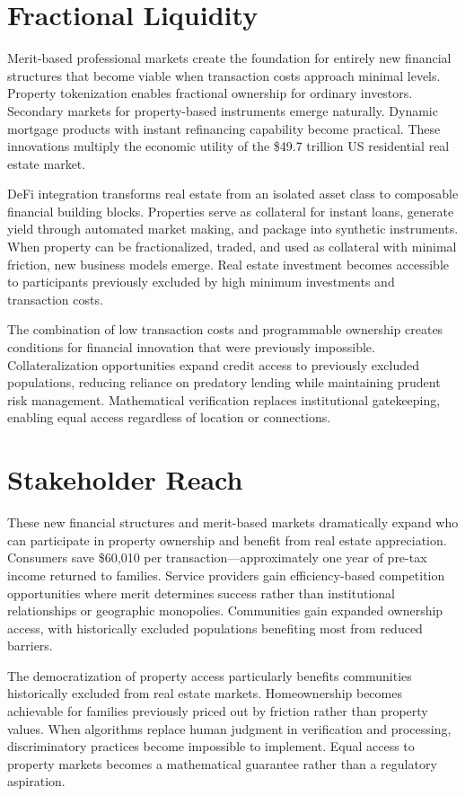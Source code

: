 \section{Fractional Liquidity}

Merit-based professional markets create the foundation for entirely new financial structures that become viable when transaction costs approach minimal levels. Property tokenization enables fractional ownership for ordinary investors. Secondary markets for property-based instruments emerge naturally. Dynamic mortgage products with instant refinancing capability become practical. These innovations multiply the economic utility of the \$49.7 trillion US residential real estate market.

DeFi integration transforms real estate from an isolated asset class to composable financial building blocks. Properties serve as collateral for instant loans, generate yield through automated market making, and package into synthetic instruments. When property can be fractionalized, traded, and used as collateral with minimal friction, new business models emerge. Real estate investment becomes accessible to participants previously excluded by high minimum investments and transaction costs.

The combination of low transaction costs and programmable ownership creates conditions for financial innovation that were previously impossible. Collateralization opportunities expand credit access to previously excluded populations, reducing reliance on predatory lending while maintaining prudent risk management. Mathematical verification replaces institutional gatekeeping, enabling equal access regardless of location or connections.

\section{Stakeholder Reach}

These new financial structures and merit-based markets dramatically expand who can participate in property ownership and benefit from real estate appreciation. Consumers save \$60,010 per transaction---approximately one year of pre-tax income returned to families. Service providers gain efficiency-based competition opportunities where merit determines success rather than institutional relationships or geographic monopolies. Communities gain expanded ownership access, with historically excluded populations benefiting most from reduced barriers.

The democratization of property access particularly benefits communities historically excluded from real estate markets. Homeownership becomes achievable for families previously priced out by friction rather than property values. When algorithms replace human judgment in verification and processing, discriminatory practices become impossible to implement. Equal access to property markets becomes a mathematical guarantee rather than a regulatory aspiration.

